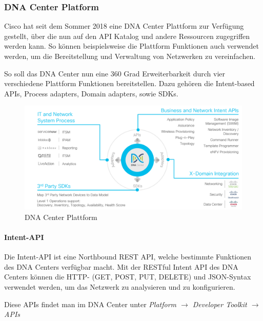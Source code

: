 \subsubsection{DNA Center Platform}
Cisco hat seit dem Sommer 2018 eine DNA Center Plattform zur Verfügung gestellt, über die nun auf den API Katalog und andere Ressourcen zugegriffen werden kann. So können beispielsweise die Plattform Funktionen auch verwendet werden, um die Bereitstellung und Verwaltung von Netzwerken zu vereinfachen.


So soll das DNA Center nun eine 360 Grad Erweiterbarkeit durch vier verschiedene Plattform Funktionen bereitstellen. Dazu gehören die Intent-based APIs, Process adapters, Domain adapters, sowie SDKs. \cite{dnac-platform}

\begin{figure}[H]
	\centering
	\includegraphics[width=0.8\linewidth]{img/Abstrahierung/dnac-platform}
	\caption{DNA Center Plattform \cite{dnac-platform}}
	\label{fig:DNA Center Plattform}
\end{figure}



\paragraph{Intent-API}

Die Intent-API ist eine Northbound REST API, welche bestimmte Funktionen des DNA Centers verfügbar macht. Mit der RESTful Intent API des DNA Centers können die HTTP- (GET, POST, PUT, DELETE) und JSON-Syntax verwendet werden, um das Netzwerk zu analysieren und zu konfigurieren. \cite{dnac-platform}

Diese APIs findet man im DNA Center unter \textit{Platform $\rightarrow$ Developer Toolkit $\rightarrow$ APIs}

